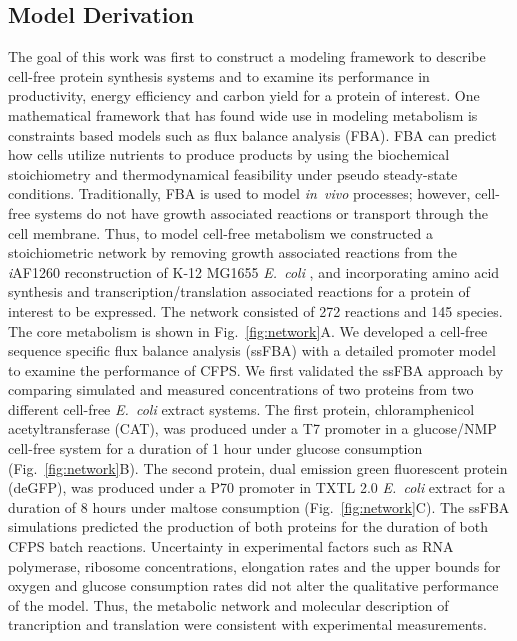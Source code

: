 \documentclass[journal=asbcd6,manuscript=article]{achemso}
\begin{document}
\subsection{Model Derivation}
The goal of this work was first to construct a modeling framework to describe cell-free protein synthesis systems and to examine its performance in productivity, energy efficiency and carbon yield for a protein of interest.
One mathematical framework that has found wide use in modeling metabolism is constraints based models such as flux balance analysis (FBA).
FBA can predict how cells utilize nutrients to produce products by using the biochemical stoichiometry and thermodynamical feasibility under pseudo steady-state conditions.
Traditionally, FBA is used to model \textit{in~vivo} processes; however, cell-free systems do not have growth associated reactions or transport through the cell membrane.
Thus, to model cell-free metabolism we constructed a stoichiometric network by removing growth associated reactions from the \textit{i}AF1260 reconstruction of K-12 MG1655 \textit{E.~coli} \cite{Feist:2007aa}, and incorporating amino acid synthesis and transcription/translation associated reactions \cite{Allen:2003aa} for a protein of interest to be expressed.
The network consisted of 272 reactions and 145 species.
The core metabolism is shown in Fig.~\ref{fig:network}A.
We developed a cell-free sequence specific flux balance analysis (ssFBA) with a detailed promoter model \cite{Moon:2012aa} to examine the performance of CFPS.
We first validated the ssFBA approach by comparing simulated and measured concentrations of two proteins from two different cell-free \textit{E.~coli} extract systems.
The first protein, chloramphenicol acetyltransferase (CAT), was produced under a T7 promoter in a glucose/NMP cell-free system \cite{2005_calhoun_BiotechnologyProgress} for a duration of 1 hour under glucose consumption (Fig.~\ref{fig:network}B).
The second protein, dual emission green fluorescent protein (deGFP), was produced under a P70 promoter in TXTL 2.0 \textit{E.~coli} extract for a duration of 8 hours under maltose consumption (Fig.~\ref{fig:network}C).
The ssFBA simulations predicted the production of both proteins for the duration of both CFPS batch reactions.
Uncertainty in experimental factors such as RNA polymerase, ribosome concentrations, elongation rates and the upper bounds for oxygen and glucose consumption rates did not alter the qualitative performance of the model.
Thus, the metabolic network and molecular description of trancription and translation were consistent with experimental measurements.
\end{document}
